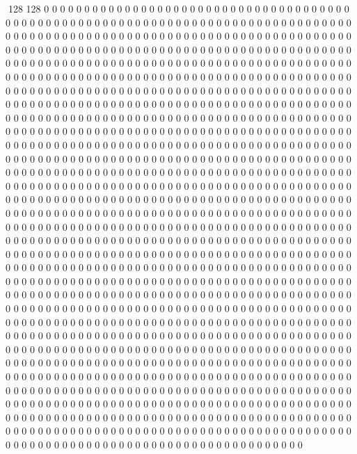 128 128
0 0 0 0 0 0 0 0 0 0 0 0 0 0 0 0 0 0 0 0 0 0 0 0 0 0 0 0 0 0 0 0 0 0 0 0 0 0 0 0 0 0 0 0 0 0 0 0 0 0 0 0 0 0 0 0 0 0 0 0 0 0 0 0 0 0 0 0 0 0 0 0 0 0 0 0 0 0 0 0 0 0 0 0 0 0 0 0 0 0 0 0 0 0 0 0 0 0 0 0 0 0 0 0 0 0 0 0 0 0 0 0 0 0 0 0 0 0 0 0 0 0 0 0 0 0 0 0
0 0 0 0 0 0 0 0 0 0 0 0 0 0 0 0 0 0 0 0 0 0 0 0 0 0 0 0 0 0 0 0 0 0 0 0 0 0 0 0 0 0 0 0 0 0 0 0 0 0 0 0 0 0 0 0 0 0 0 0 0 0 0 0 0 0 0 0 0 0 0 0 0 0 0 0 0 0 0 0 0 0 0 0 0 0 0 0 0 0 0 0 0 0 0 0 0 0 0 0 0 0 0 0 0 0 0 0 0 0 0 0 0 0 0 0 0 0 0 0 0 0 0 0 0 0 0 0
0 0 0 0 0 0 0 0 0 0 0 0 0 0 0 0 0 0 0 0 0 0 0 0 0 0 0 0 0 0 0 0 0 0 0 0 0 0 0 0 0 0 0 0 0 0 0 0 0 0 0 0 0 0 0 0 0 0 0 0 0 0 0 0 0 0 0 0 0 0 0 0 0 0 0 0 0 0 0 0 0 0 0 0 0 0 0 0 0 0 0 0 0 0 0 0 0 0 0 0 0 0 0 0 0 0 0 0 0 0 0 0 0 0 0 0 0 0 0 0 0 0 0 0 0 0 0 0
0 0 0 0 0 0 0 0 0 0 0 0 0 0 0 0 0 0 0 0 0 0 0 0 0 0 0 0 0 0 0 0 0 0 0 0 0 0 0 0 0 0 0 0 0 0 0 0 0 0 0 0 0 0 0 0 0 0 0 0 0 0 0 0 0 0 0 0 0 0 0 0 0 0 0 0 0 0 0 0 0 0 0 0 0 0 0 0 0 0 0 0 0 0 0 0 0 0 0 0 0 0 0 0 0 0 0 0 0 0 0 0 0 0 0 0 0 0 0 0 0 0 0 0 0 0 0 0
0 0 0 0 0 0 0 0 0 0 0 0 0 0 0 0 0 0 0 0 0 0 0 0 0 0 0 0 0 0 0 0 0 0 0 0 0 0 0 0 0 0 0 0 0 0 0 0 0 0 0 0 0 0 0 0 0 0 0 0 0 0 0 0 0 0 0 0 0 0 0 0 0 0 0 0 0 0 0 0 0 0 0 0 0 0 0 0 0 0 0 0 0 0 0 0 0 0 0 0 0 0 0 0 0 0 0 0 0 0 0 0 0 0 0 0 0 0 0 0 0 0 0 0 0 0 0 0
0 0 0 0 0 0 0 0 0 0 0 0 0 0 0 0 0 0 0 0 0 0 0 0 0 0 0 0 0 0 0 0 0 0 0 0 0 0 0 0 0 0 0 0 0 0 0 0 0 0 0 0 0 0 0 0 0 0 0 0 0 0 0 0 0 0 0 0 0 0 0 0 0 0 0 0 0 0 0 0 0 0 0 0 0 0 0 0 0 0 0 0 0 0 0 0 0 0 0 0 0 0 0 0 0 0 0 0 0 0 0 0 0 0 0 0 0 0 0 0 0 0 0 0 0 0 0 0
0 0 0 0 0 0 0 0 0 0 0 0 0 0 0 0 0 0 0 0 0 0 0 0 0 0 0 0 0 0 0 0 0 0 0 0 0 0 0 0 0 0 0 0 0 0 0 0 0 0 0 0 0 0 0 0 0 0 0 0 0 0 0 0 0 0 0 0 0 0 0 0 0 0 0 0 0 0 0 0 0 0 0 0 0 0 0 0 0 0 0 0 0 0 0 0 0 0 0 0 0 0 0 0 0 0 0 0 0 0 0 0 0 0 0 0 0 0 0 0 0 0 0 0 0 0 0 0
0 0 0 0 0 0 0 0 0 0 0 0 0 0 0 0 0 0 0 0 0 0 0 0 0 0 0 0 0 0 0 0 0 0 0 0 0 0 0 0 0 0 0 0 0 0 0 0 0 0 0 0 0 0 0 0 0 0 0 0 0 0 0 0 0 0 0 0 0 0 0 0 0 0 0 0 0 0 0 0 0 0 0 0 0 0 0 0 0 0 0 0 0 0 0 0 0 0 0 0 0 0 0 0 0 0 0 0 0 0 0 0 0 0 0 0 0 0 0 0 0 0 0 0 0 0 0 0
0 0 0 0 0 0 0 0 0 0 0 0 0 0 0 0 0 0 0 0 0 0 0 0 0 0 0 0 0 0 0 0 0 0 0 0 0 0 0 0 0 0 0 0 0 0 0 0 0 0 0 0 0 0 0 0 0 0 0 0 0 0 0 0 0 0 0 0 0 0 0 0 0 0 0 0 0 0 0 0 0 0 0 0 0 0 0 0 0 0 0 0 0 0 0 0 0 0 0 0 0 0 0 0 0 0 0 0 0 0 0 0 0 0 0 0 0 0 0 0 0 0 0 0 0 0 0 0
0 0 0 0 0 0 0 0 0 0 0 0 0 0 0 0 0 0 0 0 0 0 0 0 0 0 0 0 0 0 0 0 0 0 0 0 0 0 0 0 0 0 0 0 0 0 0 0 0 0 0 0 0 0 0 0 0 0 0 0 0 0 0 0 0 0 0 0 0 0 0 0 0 0 0 0 0 0 0 0 0 0 0 0 0 0 0 0 0 0 0 0 0 0 0 0 0 0 0 0 0 0 0 0 0 0 0 0 0 0 0 0 0 0 0 0 0 0 0 0 0 0 0 0 0 0 0 0
0 0 0 0 0 0 0 0 0 0 0 0 0 0 0 0 0 0 0 0 0 0 0 0 0 0 0 0 0 0 0 0 0 0 0 0 0 0 0 0 0 0 0 0 0 0 0 0 0 0 0 0 0 0 0 0 0 0 0 0 0 0 0 0 0 0 0 0 0 0 0 0 0 0 0 0 0 0 0 0 0 0 0 0 0 0 0 0 0 0 0 0 0 0 0 0 0 0 0 0 0 0 0 0 0 0 0 0 0 0 0 0 0 0 0 0 0 0 0 0 0 0 0 0 0 0 0 0
